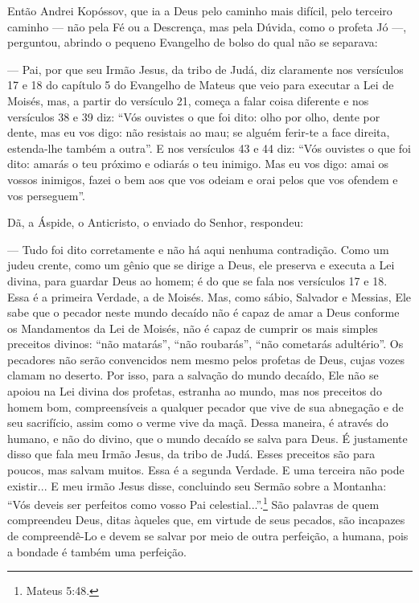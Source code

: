 Então Andrei Kopóssov, que ia a Deus pelo caminho mais difícil, pelo
terceiro caminho --- não pela Fé ou a Descrença, mas pela Dúvida, como o
profeta Jó ---, perguntou, abrindo o pequeno Evangelho de bolso do qual
não se separava:

--- Pai, por que seu Irmão Jesus, da tribo de Judá, diz claramente nos
versículos 17 e 18 do capítulo 5 do Evangelho de Mateus que veio para
executar a Lei de Moisés, mas, a partir do versículo 21, começa a falar
coisa diferente e nos versículos 38 e 39 diz: ``Vós ouvistes o que foi
dito: olho por olho, dente por dente, mas eu vos digo: não resistais ao
mau; se alguém ferir-te a face direita, estenda-lhe também a outra''. E
nos versículos 43 e 44 diz: ``Vós ouvistes o que foi dito: amarás o teu
próximo e odiarás o teu inimigo. Mas eu vos digo: amai os vossos
inimigos, fazei o bem aos que vos odeiam e orai pelos que vos ofendem e
vos perseguem''.

Dã, a Áspide, o Anticristo, o enviado do Senhor, respondeu:

--- Tudo foi dito corretamente e não há aqui nenhuma contradição. Como
um judeu crente, como um gênio que se dirige a Deus, ele preserva e
executa a Lei divina, para guardar Deus ao homem; é do que se fala nos
versículos 17 e 18. Essa é a primeira Verdade, a de Moisés. Mas, como
sábio, Salvador e Messias, Ele sabe que o pecador neste mundo decaído
não é capaz de amar a Deus conforme os Mandamentos da Lei de Moisés, não
é capaz de cumprir os mais simples preceitos divinos: ``não matarás'',
``não roubarás'', ``não cometarás adultério''. Os pecadores não serão
convencidos nem mesmo pelos profetas de Deus, cujas vozes clamam no
deserto. Por isso, para a salvação do mundo decaído, Ele não se apoiou
na Lei divina dos profetas, estranha ao mundo, mas nos preceitos do
homem bom, compreensíveis a qualquer pecador que vive de sua abnegação e
de seu sacrifício, assim como o verme vive da maçã. Dessa maneira, é
através do humano, e não do divino, que o mundo decaído se salva para
Deus. É justamente disso que fala meu Irmão Jesus, da tribo de Judá.
Esses preceitos são para poucos, mas salvam muitos. Essa é a segunda
Verdade. E uma terceira não pode existir... E meu irmão Jesus disse,
concluindo seu Sermão sobre a Montanha: ``Vós deveis ser perfeitos como
vosso Pai celestial...''.\footnote{Mateus 5:48.} São palavras de quem
compreendeu Deus, ditas àqueles que, em virtude de seus pecados, são
incapazes de compreendê-Lo e devem se salvar por meio de outra
perfeição, a humana, pois a bondade é também uma perfeição.

